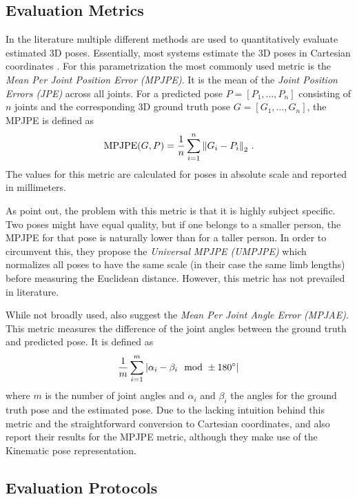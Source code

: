 \subsection{Evaluation Metrics}
In the literature multiple different methods are used to quantitatively evaluate estimated 3D poses. 
Essentially, most systems estimate the 3D poses in Cartesian coordinates \cite{drover18, chen17, bogo16, grinciunaite16, yasin16, wandt19, tome17, tekin16, tekin17, pavlakos17}.
For this parametrization the most commonly used metric is the \emph{Mean Per Joint Position Error (MPJPE)}.
It is the mean of the \emph{Joint Position Errors (JPE)} across all joints.
For a predicted pose $P = [P_1, \dotsc, P_n]$ consisting of $n$ joints and the corresponding 3D ground truth pose $G = [G_1, \dotsc, G_n]$, the MPJPE is defined as
\begin{equation}
\mathrm{MPJPE}(G, P) = \frac{1}{n} \sum_{i = 1}^{n}  \norm{G_i - P_i}_2 \ .
\end{equation}
The values for this metric are calculated for poses in absolute scale and reported in millimeters.

As \citet{ionescu14} point out, the problem with this metric is that it is highly subject specific.
Two poses might have equal quality, but if one belongs to a smaller person, the MPJPE for that pose is naturally lower than for a taller person.
In order to circumvent this, they propose the \emph{Universal MPJPE (UMPJPE)} which normalizes all poses to have the same scale (in their case the same limb lengths) before measuring the Euclidean distance.
However, this metric has not prevailed in literature.

While not broadly used, \citet{ionescu14} also suggest the \emph{Mean Per Joint Angle Error (MPJAE)}.
This metric measures the difference of the joint angles between the ground truth and predicted pose.
It is defined as
\begin{equation}
\frac{1}{m} \sum_{i = 1}^{m} \abs{\alpha_i - \beta_i \mod \pm 180\degree} \,
\end{equation}
where $m$ is the number of joint angles and $\alpha_i$ and $\beta_i$ the angles for the ground truth pose and the estimated pose.
Due to the lacking intuition behind this metric and the straightforward conversion to Cartesian coordinates, \citet{jahangiri17} and \citet{zhou16_2} also report their results for the MPJPE metric, although they make use of the Kinematic pose representation.

\subsection{Evaluation Protocols}

